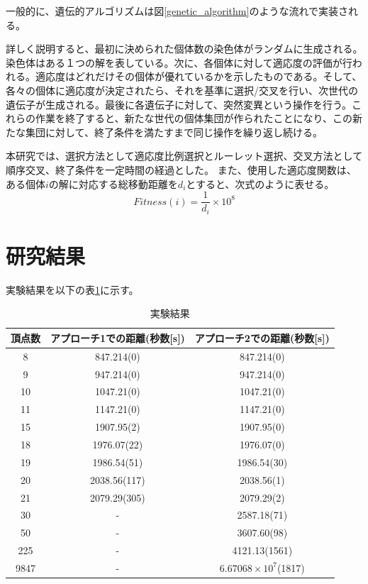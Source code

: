 \documentclass[a4paper, 11pt]{jsarticle}
\begin{document}
	一般的に、遺伝的アルゴリズムは図\ref{genetic_algorithm}のような流れで実装される。

	詳しく説明すると、最初に決められた個体数の染色体がランダムに生成される。染色体はある１つの解を表している。次に、各個体に対して適応度の評価が行われる。適応度はどれだけその個体が優れているかを示したものである。そして、各々の個体に適応度が決定されたら、それを基準に選択/交叉を行い、次世代の遺伝子が生成される。最後に各遺伝子に対して、突然変異という操作を行う。これらの作業を終了すると、新たな世代の個体集団が作られたことになり、この新たな集団に対して、終了条件を満たすまで同じ操作を繰り返し続ける。

	本研究では、選択方法として適応度比例選択とルーレット選択、交叉方法として順序交叉、終了条件を一定時間の経過とした。
	また、使用した適応度関数は、ある個体$i$の解に対応する総移動距離を$d_i$とすると、次式のように表せる。
	\begin{equation*}
		Fitness(i) = \frac{1}{d_i} \times 10^8
	\end{equation*}

\pagebreak
\section{研究結果}
	実験結果を以下の表\ref{result}に示す。
	\begin{table}[htbp]
		\centering
		\begin{tabular}{c||c|c}
			頂点数 & アプローチ1での距離(秒数[s]) & アプローチ2での距離(秒数[s]) \\ \hline
			8 & 847.214(0) & 847.214(0) \\
			9 & 947.214(0) & 947.214(0) \\
			10 & 1047.21(0) & 1047.21(0) \\
			11 & 1147.21(0) & 1147.21(0) \\
			15 & 1907.95(2) & 1907.95(0) \\
			18 & 1976.07(22) & 1976.07(0) \\
			19 & 1986.54(51) & 1986.54(30) \\
			20 & 2038.56(117) & 2038.56(1) \\
			21 & 2079.29(305) & 2079.29(2) \\
			30 & - & 2587.18(71) \\
			50 & - & 3607.60(98) \\
			225 & - & 4121.13(1561) \\
			9847 & - & $6.67068\times10^7$(1817) \\
			
		\end{tabular}
		\caption{実験結果}
		\label{result}
	\end{table}
\end{document}
